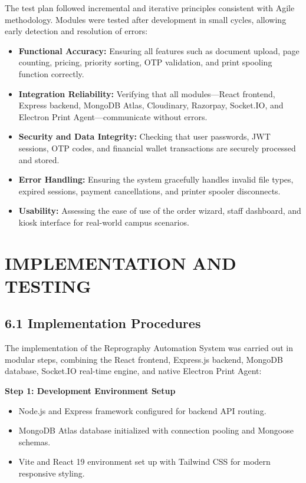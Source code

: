 \documentclass[12pt,a4paper]{report}
\begin{document}
The test plan followed incremental and iterative principles consistent with Agile methodology. Modules were tested after development in small cycles, allowing early detection and resolution of errors:
\begin{itemize}[leftmargin=0.35in, itemsep=2pt]
  \item \textbf{Functional Accuracy:} Ensuring all features such as document upload, page counting, pricing, priority sorting, OTP validation, and print spooling function correctly.
  \item \textbf{Integration Reliability:} Verifying that all modules---React frontend, Express backend, MongoDB Atlas, Cloudinary, Razorpay, Socket.IO, and Electron Print Agent---communicate without errors.
  \item \textbf{Security and Data Integrity:} Checking that user passwords, JWT sessions, OTP codes, and financial wallet transactions are securely processed and stored.
  \item \textbf{Error Handling:} Ensuring the system gracefully handles invalid file types, expired sessions, payment cancellations, and printer spooler disconnects.
  \item \textbf{Usability:} Assessing the ease of use of the order wizard, staff dashboard, and kiosk interface for real-world campus scenarios.
\end{itemize}

\newpage
\chapter{IMPLEMENTATION AND TESTING}

\section{6.1 Implementation Procedures}
The implementation of the Reprography Automation System was carried out in modular steps, combining the React frontend, Express.js backend, MongoDB database, Socket.IO real-time engine, and native Electron Print Agent:

\noindent\textbf{Step 1: Development Environment Setup}
\begin{itemize}[leftmargin=0.35in, itemsep=1pt]
  \item Node.js and Express framework configured for backend API routing.
  \item MongoDB Atlas database initialized with connection pooling and Mongoose schemas.
  \item Vite and React 19 environment set up with Tailwind CSS for modern responsive styling.
\end{itemize}
\end{document}
